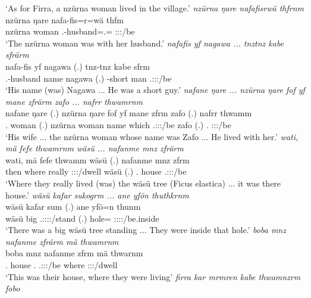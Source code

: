\begin{exe}
	\trans `As for Firra, a nzürna woman lived in the village.'
	\emph{nzürna ŋare nafafisrwä thfrnm}\\
	\gll nzürna ŋare nafa-fis=r=wä thfm\\
	nzürna woman \Third.\Poss-husband=\Assoc.\Du=\Emph{} \Stdu:\Sbj:\Pst:\Dur/be\\
	\trans `The nzürna woman was with her husband.'
	\emph{nafafis yf nagawa ... tnztnz kabe sfrärm}\\
	\gll nafa-fis yf nagawa (.) tnz-tnz kabe sfrm\\
	\Third.\Poss-husband name nagawa (.) \Redup-short man \Tsg.\Masc:\Sbj:\Pst:\Dur/be\\
	\trans `His name (was) Nagawa ... He was a short guy.'
	\emph{nafane ŋare ... nzürna ŋare fof yf mane zfrärm zafo ... nafrr thwamrnm}\\
	\gll nafane ŋare (.) nzürna ŋare fof yf mane zfrm zafo (.) nafrr thwamm\\
	\Tsg.\Poss{} woman (.) nzürna woman \Emph{} name which \Tsg.\F:\Sbj:\Pst:\Dur/be zafo (.) \Tdu.\Assoc{} \Stdu:\Sbj:\Pst:\Dur/be\\
	\trans `His wife ... the nzürna woman whose name was Zafo ... He lived with her.'
	\emph{wati, mä fefe thwamrnm wäsü ... nafanme mnz zfrärm}\\
	\gll wati, mä fefe thwamm wäsü (.) nafanme mnz zfrm\\
	then where really \Stdu:\Sbj:\Pst:\Dur/dwell wäsü (.) \Tnsg.\Poss{} house \Tsg.\F:\Sbj:\Pst:\Dur/be\\
	\trans `Where they really lived (was) the wäsü tree (Ficus elastica) ... it was there house.'
	\emph{wäsü kafar sukogrm ... ane yfön thuthkrnm}\\
	\gll wäsü kafar sum (.) ane yfö=n thunm\\
	wäsü big \Tsg.\Masc:\Sbj:\Pst:\Dur:\Stat/stand (.) \Dem{} hole=\Loc{} \Stdu:\Sbj:\Pst:\Dur:\Stat/be.inside\\
	\trans `There was a big wäsü tree standing ... They were inside that hole.'
	\emph{boba mnz nafanme zfrärm mä thwamrnm}\\
	\gll boba mnz nafanme zfrm mä thwarnm\\
	\Med.\Abl{} house \Tnsg.\Poss{} \Tsg.\F:\Sbj:\Pst:\Dur/be where \Stdu:\Sbj:\Pst:\Dur/dwell\\
	\trans `This was their house, where they were living'
	\emph{firra kar mrmren kabe thwamnzrm fobo}\\

\end{exe}
